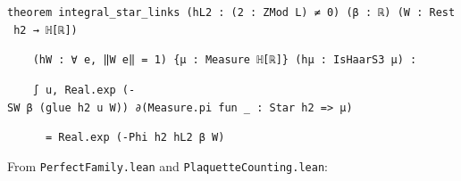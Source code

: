 \documentclass[11pt,a4paper]{article}
\theoremstyle{named}
\begin{document}
\begin{leancode}
\item \texttt{theorem\ \allowbreak{}integral\_\allowbreak{}star\_\allowbreak{}links\ \allowbreak{}(hL2\ \allowbreak{}:\ \allowbreak{}(2\ \allowbreak{}:\ \allowbreak{}ZMod\ \allowbreak{}L)\ \allowbreak{}≠\ \allowbreak{}0)\ \allowbreak{}(β\ \allowbreak{}:\ \allowbreak{}ℝ)\ \allowbreak{}(W\ \allowbreak{}:\ \allowbreak{}Rest\ \allowbreak{}h2\ \allowbreak{}→\ \allowbreak{}ℍ[ℝ])}
\item \texttt{\ \allowbreak{}\ \allowbreak{}\ \allowbreak{}\ \allowbreak{}(hW\ \allowbreak{}:\ \allowbreak{}∀\ \allowbreak{}e,\ \allowbreak{}‖W\ \allowbreak{}e‖\ \allowbreak{}=\ \allowbreak{}1)\ \allowbreak{}\{μ\ \allowbreak{}:\ \allowbreak{}Measure\ \allowbreak{}ℍ[ℝ]\}\ \allowbreak{}(hμ\ \allowbreak{}:\ \allowbreak{}IsHaarS3\ \allowbreak{}μ)\ \allowbreak{}:}
\item \texttt{\ \allowbreak{}\ \allowbreak{}\ \allowbreak{}\ \allowbreak{}∫\ \allowbreak{}u,\ \allowbreak{}Real.\allowbreak{}exp\ \allowbreak{}(-SW\ \allowbreak{}β\ \allowbreak{}(glue\ \allowbreak{}h2\ \allowbreak{}u\ \allowbreak{}W))\ \allowbreak{}∂(Measure.\allowbreak{}pi\ \allowbreak{}fun\ \allowbreak{}\_\allowbreak{}\ \allowbreak{}:\ \allowbreak{}Star\ \allowbreak{}h2\ \allowbreak{}=\textgreater{}\ \allowbreak{}μ)}
\item \texttt{\ \allowbreak{}\ \allowbreak{}\ \allowbreak{}\ \allowbreak{}\ \allowbreak{}\ \allowbreak{}=\ \allowbreak{}Real.\allowbreak{}exp\ \allowbreak{}(-Phi\ \allowbreak{}h2\ \allowbreak{}hL2\ \allowbreak{}β\ \allowbreak{}W)}
\end{leancode}
From \texttt{PerfectFamily.\allowbreak{}lean} and \texttt{PlaquetteCounting.\allowbreak{}lean}:
\end{document}
